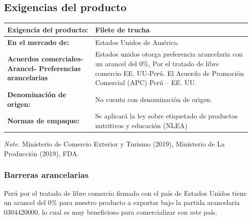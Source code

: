 \documentclass[
  stu,
  floatsintext,
  longtable,
  a4paper,
  nolmodern,
  notxfonts,
  notimes,
  colorlinks=true,linkcolor=blue,citecolor=blue,urlcolor=blue]{apa7}
\begin{document}
\subsection{Exigencias del producto}\label{exigencias-del-producto}

\begin{table}

{\caption{{Exigencias del producto a exportar}{\label{tbl-mytable}}}}

\begin{longtable}[]{@{}
  >{\raggedright\arraybackslash}p{}
  >{\raggedright\arraybackslash}p{}@{}}
\toprule\noalign{}
\begin{minipage}[b]{\linewidth}\raggedright
\textbf{Exigencia del producto:}
\end{minipage} & \begin{minipage}[b]{\linewidth}\raggedright
Filete de trucha
\end{minipage} \\
\midrule\noalign{}
\endhead
\bottomrule\noalign{}
\endlastfoot
\textbf{En el mercado de:} & Estados Unidos de América. \\
\textbf{Acuerdos comerciales- Arancel- Preferencias arancelarias} &
Estados unidos otorga preferencia arancelaria con un arancel del 0\%,
Por el tratado de libre comercio EE. UU-Perú. El Acuerdo de Promoción
Comercial (APC) Perú -- EE. UU. \\
\textbf{Denominación de origen:} & No cuenta con denominación de
origen. \\
\textbf{Normas de empaque:} & Se aplicará la ley sobre etiquetado de
productos nutritivos y educación (NLEA) \\
\end{longtable}

{\noindent \emph{Note.} Ministerio de Comercio Exterior y Turismo (2019), Ministerio de La Producción (2019), FDA.}

\end{table}

\subsubsection{Barreras arancelarias}\label{barreras-arancelarias}

Perú por el tratado de libre comercio firmado con el país de Estados
Unidos tiene un arancel del 0\% para nuestro producto a exportar bajo la
partida arancelaria 0304420000, lo cual es muy beneficioso para
comercializar con este país.
\end{document}
